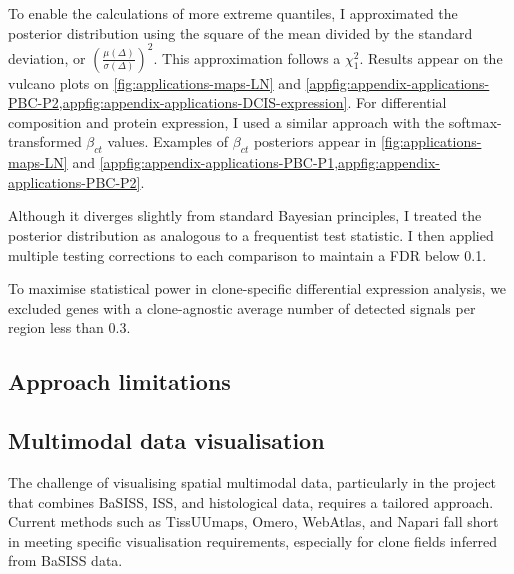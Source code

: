 To enable the calculations of more extreme quantiles, I approximated the posterior distribution using the square of the mean divided by the standard deviation, or $\left(\frac{\mu(\Delta)}{\sigma(\Delta)}\right)^2$. This approximation follows a $\chi_{1}^{2}$. Results appear on the vulcano plots on \cref{fig:applications-maps-LN} and \cref{appfig:appendix-applications-PBC-P2,appfig:appendix-applications-DCIS-expression}. For differential composition and protein expression, I used a similar approach with the softmax-transformed $\beta_{ct}$ values. Examples of $\beta_{ct}$ posteriors appear in \cref{fig:applications-maps-LN} and \cref{appfig:appendix-applications-PBC-P1,appfig:appendix-applications-PBC-P2}. 

Although it diverges slightly from standard Bayesian principles, I treated the posterior distribution as analogous to a frequentist test statistic. I then applied multiple testing corrections to each comparison to maintain a \acf{FDR} below 0.1.

To maximise statistical power in clone-specific differential expression analysis, we excluded genes with a clone-agnostic average number of detected signals per region less than 0.3.


\subsection{Approach limitations}



\subsection{Multimodal data visualisation}
\label{sec:modalities-cancerclonemaps}

The challenge of visualising spatial multimodal data, particularly in the project that combines \ac{BaSISS}, \ac{ISS}, and histological data, requires a tailored approach. Current methods such as \ac{TissUUmaps}, \ac{Omero}, \ac{WebAtlas}, and \ac{Napari} fall short in meeting specific visualisation requirements, especially for clone fields inferred from \ac{BaSISS} data.

